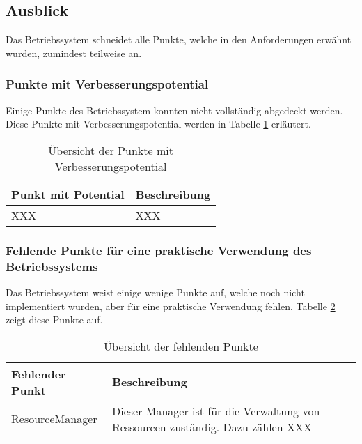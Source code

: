\subsection{Ausblick}

Das Betriebssystem schneidet alle Punkte, welche in den Anforderungen erwähnt wurden, zumindest teilweise an.

\subsubsection{Punkte mit Verbesserungspotential}
Einige Punkte des Betriebssystem konnten nicht vollständig abgedeckt werden. Diese Punkte mit Verbesserungspotential werden in Tabelle \ref{table:points-to-improve} erläutert.

\begin{table}[H]
\begin{tabular}{p{5cm} | p{9cm}}
  \textbf{Punkt mit Potential} & \textbf{Beschreibung}
  \\ \hline
  XXX & XXX \\
  
 \end{tabular}
 \caption{Übersicht der Punkte mit Verbesserungspotential}
 \label{table:points-to-improve}
\end{table}

\subsubsection{Fehlende Punkte für eine praktische Verwendung des Betriebssystems}
Das Betriebssystem weist einige wenige Punkte auf, welche noch nicht implementiert wurden, aber für eine praktische Verwendung fehlen. Tabelle \ref{table:missing-points} zeigt diese Punkte auf.

\begin{table}[H]
\begin{tabular}{p{5cm} | p{9cm}}
  \textbf{Fehlender Punkt} & \textbf{Beschreibung}
  \\ \hline
  ResourceManager & Dieser Manager ist für die Verwaltung von Ressourcen zuständig. Dazu zählen XXX\\
  
 \end{tabular}
 \caption{Übersicht der fehlenden Punkte}
 \label{table:missing-points}
\end{table}